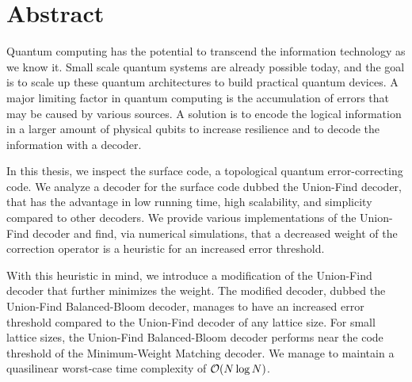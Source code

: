 \chapter*{Abstract}

Quantum computing has the potential to transcend the information technology as we know it. Small scale quantum systems are already possible today, and the goal is to scale up these quantum architectures to build practical quantum devices. A major limiting factor in quantum computing is the accumulation of errors that may be caused by various sources. A solution is to encode the logical information in a larger amount of physical qubits to increase resilience and to decode the information with a decoder. 

In this thesis, we inspect the surface code, a topological quantum error-correcting code. We analyze a decoder for the surface code dubbed the Union-Find decoder, that has the advantage in low running time, high scalability, and simplicity compared to other decoders. We provide various implementations of the Union-Find decoder and find, via numerical simulations, that a decreased weight of the correction operator is a heuristic for an increased error threshold. 

With this heuristic in mind, we introduce a modification of the Union-Find decoder that further minimizes the weight. The modified decoder, dubbed the Union-Find Balanced-Bloom decoder, manages to have an increased error threshold compared to the Union-Find decoder of any lattice size. For small lattice sizes, the Union-Find Balanced-Bloom decoder performs near the code threshold of the Minimum-Weight Matching decoder. We manage to maintain a quasilinear worst-case time complexity of $\mathcal{O}(N\log{N})$. 